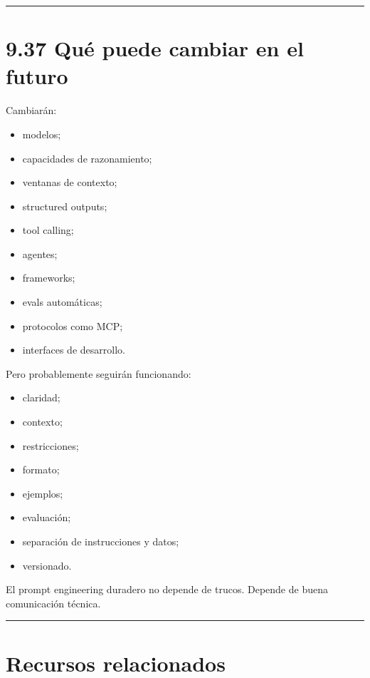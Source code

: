 \begin{center}\rule{0.5\linewidth}{0.5pt}\end{center}

\section{9.37 Qué puede cambiar en el
futuro}\label{quuxe9-puede-cambiar-en-el-futuro-8}

Cambiarán:

\begin{itemize}
\tightlist
\item
  modelos;
\item
  capacidades de razonamiento;
\item
  ventanas de contexto;
\item
  structured outputs;
\item
  tool calling;
\item
  agentes;
\item
  frameworks;
\item
  evals automáticas;
\item
  protocolos como MCP;
\item
  interfaces de desarrollo.
\end{itemize}

Pero probablemente seguirán funcionando:

\begin{itemize}
\tightlist
\item
  claridad;
\item
  contexto;
\item
  restricciones;
\item
  formato;
\item
  ejemplos;
\item
  evaluación;
\item
  separación de instrucciones y datos;
\item
  versionado.
\end{itemize}

El prompt engineering duradero no depende de trucos. Depende de buena
comunicación técnica.

\begin{center}\rule{0.5\linewidth}{0.5pt}\end{center}

\section{Recursos relacionados}\label{recursos-relacionados-8}

